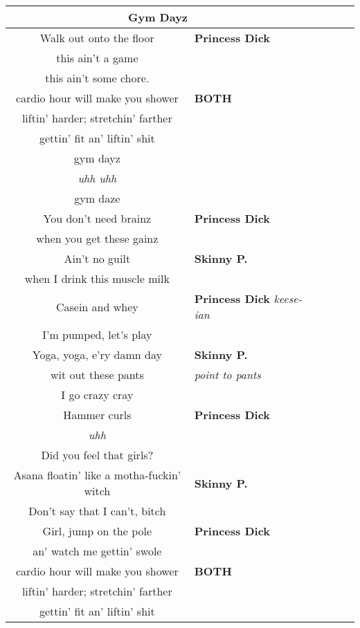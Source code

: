 \documentclass{article}
\begin{document}
\begin{center}
\begin{tabularx}{\linewidth}{c*{5}{X}}
\hline
\multicolumn{2}{c}{\textbf{Gym Dayz}} \\ \hline
\rowcolor{Gray}
Walk out onto the floor & \textbf{Princess Dick} \\
\rowcolor{Gray}
this ain't a game & \\
\rowcolor{Gray}
this ain't some chore. & \\ \hline
cardio hour will make you shower & \textbf{BOTH}\\
liftin' harder; stretchin' farther & \\
gettin' fit an' liftin' shit & \\
gym dayz & \\
\textit{uhh uhh} & \\
gym daze & \\ \hline
\rowcolor{Gray}
You don't need brainz & \textbf{Princess Dick} \\
\rowcolor{Gray}
when you get these gainz & \\
Ain't no guilt & \textbf{Skinny P.}\\
when I drink this muscle milk & \\
\rowcolor{Gray}
Casein and whey & \textbf{Princess Dick} \textit{keese-ian}\\
\rowcolor{Gray}
I'm pumped, let's play & \\
Yoga, yoga, e'ry damn day & \textbf{Skinny P.}\\
wit out these pants & \textit{point to pants}\\
I go crazy cray & \\
\rowcolor{Gray}
Hammer curls & \textbf{Princess Dick} \\
\rowcolor{Gray}
\textit{uhh} & \\
\rowcolor{Gray}
Did you feel that girls? & \\
Asana floatin' like a motha-fuckin' witch & \textbf{Skinny P.}\\
Don't say that I can't, bitch & \\
\rowcolor{Gray}
Girl, jump on the pole & \textbf{Princess Dick} \\
\rowcolor{Gray}
an' watch me gettin' swole & \\ \hline
cardio hour will make you shower & \textbf{BOTH}\\
liftin' harder; stretchin' farther & \\
gettin' fit an' liftin' shit & \\

\end{tabularx}
\end{center}
\end{document}
